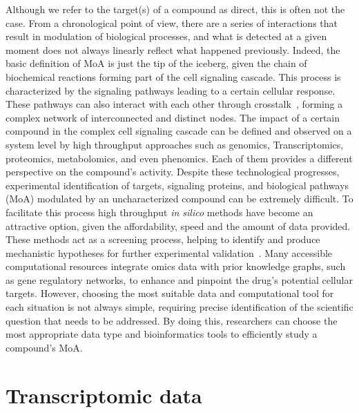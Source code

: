 Although we refer to the target(s) of a compound as direct, this is often not the case. 
From a chronological point of view, there are a series of interactions that result in modulation of biological processes, and what is detected at a given moment does not always linearly reflect what happened previously. 
Indeed, the basic definition of MoA is just the tip of the iceberg, given the chain of biochemical reactions forming part of the cell signaling cascade. 
This process is characterized by the signaling pathways leading to a certain cellular response. These pathways can also interact with each other through crosstalk~\cite{RN94}, forming a complex network of interconnected and distinct nodes. 
The impact of a certain compound in the complex cell signaling cascade can be defined and observed on a system level by high throughput approaches such as genomics, \gls{Transcriptomics}, proteomics, metabolomics, and even phenomics. 
Each of them provides a different perspective on the compound's activity. 
Despite these technological progresses, experimental identification of targets, signaling proteins, and biological pathways (\gls{MoA}) modulated by an uncharacterized compound can be extremely difficult. 
To facilitate this process high throughput \textit{in silico} methods have become an attractive option, given the affordability, speed and the amount of data provided. 
These methods act as a screening process, helping to identify and produce mechanistic hypotheses for further experimental validation~\cite{RN38}. 
Many accessible computational resources integrate omics data with prior knowledge graphs, such as gene regulatory networks, to enhance and pinpoint the drug's potential cellular targets. 
However, choosing the most suitable data and computational tool for each situation is not always simple, requiring precise identification of the scientific question that needs to be addressed. 
By doing this, researchers can choose the most appropriate data type and bioinformatics tools to efficiently study a compound's MoA.

\section{Transcriptomic data}
\label{sec:Transcriptomic_data}


